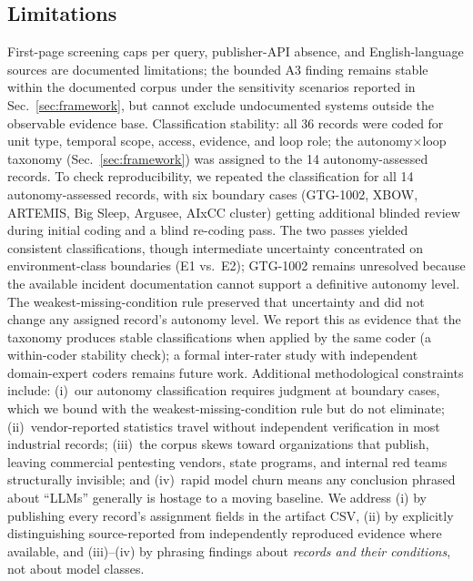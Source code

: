 \documentclass[conference,compsoc]{IEEEtran}
\begin{document}
\subsection{Limitations}
First-page screening caps per query, publisher-API absence, and English-language sources are
 documented limitations; the bounded A3 finding remains stable within the documented corpus under the sensitivity scenarios reported in Sec.~\ref{sec:framework}, but cannot exclude undocumented systems outside the observable evidence base.
 Classification stability: all 36 records were coded for unit type, temporal scope, access,
 evidence, and loop role; the autonomy$\times$loop taxonomy (Sec.~\ref{sec:framework}) was
 assigned to the 14 autonomy-assessed records. To check reproducibility, we
 repeated the classification for all 14 autonomy-assessed records, with six boundary
 cases (GTG-1002, XBOW, ARTEMIS, Big Sleep, Argusee, AIxCC cluster) getting additional
 blinded review during initial coding and a blind re-coding pass. The two passes yielded consistent
 classifications, though intermediate uncertainty concentrated on environment-class
 boundaries (E1 vs.\ E2); GTG-1002 remains unresolved because the available incident
 documentation cannot support a definitive autonomy level. The
 weakest-missing-condition rule preserved that uncertainty and did not change any
 assigned record's autonomy level. We report this as evidence that the taxonomy produces stable
 classifications when applied by the same coder (a within-coder stability check); a formal inter-rater
 study with independent domain-expert coders remains future work. Additional methodological constraints include:
 (i)~our autonomy classification requires judgment at boundary cases, which we bound with the
 weakest-missing-condition rule but do not eliminate; (ii)~vendor-reported statistics travel
 without independent verification in most industrial records; (iii)~the corpus skews toward
 organizations that publish, leaving commercial pentesting vendors, state programs, and internal
 red teams structurally invisible; and (iv)~rapid model churn means any conclusion phrased about
 ``LLMs'' generally is hostage to a moving baseline. We address (i) by publishing every record's
 assignment fields in the artifact CSV, (ii) by explicitly distinguishing source-reported from
 independently reproduced evidence where available, and
 (iii)--(iv) by phrasing findings about \emph{records and their conditions}, not about model classes.

\vspace{6pt}
\end{document}
